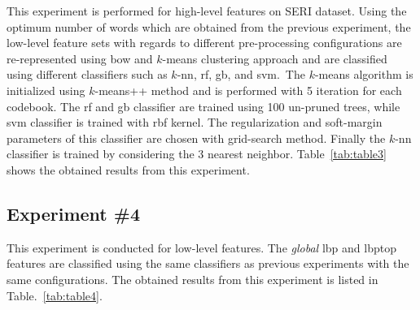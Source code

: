 This experiment is performed for high-level features on SERI dataset.
Using the optimum number of words which are obtained from the previous experiment, the low-level feature sets with regards to different pre-processing configurations are re-represented using \ac{bow} and $k$-means clustering approach and are classified using different classifiers such as $k$-\ac{nn}, \ac{rf}, \ac{gb}, and \ac{svm}.\
The $k$-means algorithm is initialized using $k$-means++ method and is performed with 5 iteration for each codebook.
The \ac{rf} and \ac{gb} classifier are trained using 100 un-pruned trees, while \ac{svm} classifier is trained with \ac{rbf} kernel.
The regularization and soft-margin parameters of this classifier are chosen with grid-search method.
Finally the $k$-\ac{nn} classifier is trained by considering the 3 nearest neighbor.
Table~\ref{tab:table3} shows the obtained results from this experiment.\\




\subsection{Experiment \#4}\label{subsec:exp4}
This experiment is conducted for low-level features.
The \emph{global} \ac{lbp} and \ac{lbptop} features are classified using the same classifiers as previous experiments with the same configurations.
The obtained results from this experiment is listed in Table.~\ref{tab:table4}.\\





